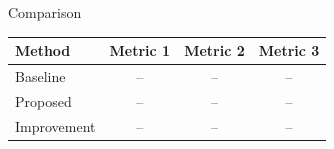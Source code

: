 \begin{frame}{Comparison}

\begin{center}
\begin{tabular}{lccc}
\toprule
\textbf{Method} & \textbf{Metric 1} & \textbf{Metric 2} & \textbf{Metric 3} \\
\midrule
Baseline & -- & -- & -- \\
Proposed & -- & -- & -- \\
Improvement & -- & -- & -- \\
\bottomrule
\end{tabular}
\end{center}

\vspace{0.35cm}


\end{frame}

